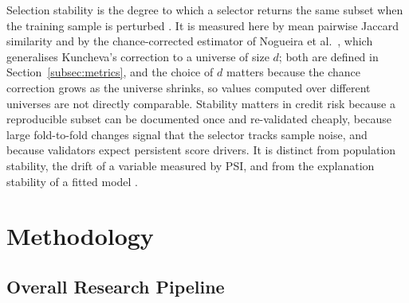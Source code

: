 \documentclass[final,5p,twocolumn]{elsarticle}
\begin{document}
Selection stability is the degree to which a selector returns the same subset when the training sample is perturbed \cite{kalousis2007}. It is measured here by mean pairwise Jaccard similarity \cite{jaccard1901} and by the chance-corrected estimator of Nogueira et al.\ \cite{nogueira2018}, which generalises Kuncheva's correction \cite{kuncheva2007} to a universe of size $d$; both are defined in Section~\ref{subsec:metrics}, and the choice of $d$ matters because the chance correction grows as the universe shrinks, so values computed over different universes are not directly comparable. Stability matters in credit risk because a reproducible subset can be documented once and re-validated cheaply, because large fold-to-fold changes signal that the selector tracks sample noise, and because validators expect persistent score drivers. It is distinct from population stability, the drift of a variable measured by PSI, and from the explanation stability of a fitted model \cite{ballegeer2025}.


\section{Methodology}
\label{sec:methodology}

\subsection{Overall Research Pipeline}
\label{subsec:pipeline}
\end{document}
